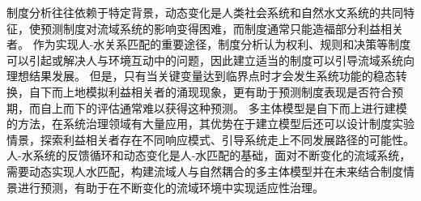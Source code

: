 制度分析往往依赖于特定背景，动态变化是人类社会系统和自然水文系统的共同特征，使预测制度对流域系统的影响变得困难，而制度通常只能造福部分利益相关者\cite{epstein2015}。
作为实现人-水关系匹配的重要途径，制度分析认为权利、规则和决策等制度可以引起或解决人与环境互动中的问题，因此建立适当的制度可以引导流域系统向理想结果发展\cite{wang2019c}。
但是，只有当关键变量达到临界点时才会发生系统功能的稳态转换，自下而上地模拟利益相关者的涌现现象，更有助于预测制度表现是否符合预期，而自上而下的评估通常难以获得这种预测\cite{reyers2018}。
多主体模型是自下而上进行建模的方法，在系统治理领域有大量应用，其优势在于建立模型后还可以设计制度实验情景，探索利益相关者存在不同响应模式、引导系统走上不同发展路径的可能性。
人-水系统的反馈循环和动态变化是人-水匹配的基础，面对不断变化的流域系统，需要动态实现人水匹配，构建流域人与自然耦合的多主体模型并在未来结合制度情景进行预测，有助于在不断变化的流域环境中实现适应性治理。
